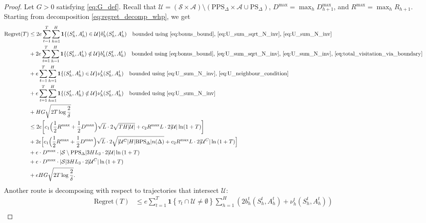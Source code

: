 \documentclass[twoside]{article}
\newcommand{\BPS}{\mathrm{BPS}_{\Delta}} %
\newcommand{\PPS}{\mathrm{PPS}_{\Delta}} %
\newcommand{\PS}{\mathrm{PS}_{\Delta}} %
\begin{document}
\begin{proof}
Let $G>0$ satisfying \eqref{eq:G_def}.
Recall that $
\mathcal{U}=(\mathcal{S}\times\mathcal{A}) \setminus (\PPS\times\mathcal{A}
\cup \PS)$, $D^{\max} = \max_h D_{h+1}^{\max}$, and $R^{\max} = \max_h R_{h+1}$. Starting from decomposition \eqref{eq:regret_decomp_whp}, we get
\begin{align*}
\mathrm{Regret}(T)
&\le
2e\sum_{t=1}^{T}\sum_{h=1}^{H}
\mathbf{1}\{(S_h^t,A_h^t)\in\mathcal{U}\}b_h^t(S_h^t,A_h^t)
\quad\text{bounded using \eqref{eq:bonus_bound}, \eqref{eq:U_sum_sqrt_N_inv}, \eqref{eq:U_sum_N_inv}}\\
&+
2e\sum_{t=1}^{T}\sum_{h=1}^{H}
\mathbf{1}\{(S_h^t,A_h^t)\notin\mathcal{U}\}b_h^t(S_h^t,A_h^t)
\quad\text{bounded using \eqref{eq:bonus_bound}, \eqref{eq:U_sum_sqrt_N_inv}, \eqref{eq:U_sum_N_inv}, \eqref{eq:total_visitation_via_boundary}}\\
&+
e\sum_{t=1}^{T}\sum_{h=1}^{H}
\mathbf{1}\{(S_h^t,A_h^t)\in\mathcal{U}\}
\nu_h^{t}(S_h^t,A_h^t)
\quad\text{bounded using \eqref{eq:U_sum_N_inv}, \eqref{eq:U_neighbour_condition}}\\
&+
e\sum_{t=1}^{T}\sum_{h=1}^{H}
\mathbf{1}\{(S_h^t,A_h^t)\notin\mathcal{U}\}
\nu_h^{t}(S_h^t,A_h^t)
\quad\text{bounded using \eqref{eq:U_sum_N_inv}}\\
&+
HG\sqrt{2T\log \dfrac{2}{\delta}}
\\
& \leq 2e\bigg[c_1\Big(\dfrac12R^{\max}+\dfrac12 D^{\max}\Big)\sqrt{L}\cdot 2\sqrt{TH|\mathcal{U}|}
+ c_2R^{\max}L\cdot 2|\mathcal{U}|\ln(1+T)\bigg]\\
&+ 2e\Big[c_1\Big(\dfrac12R^{\max}+\dfrac12 D^{\max}\Big)\sqrt{L} \cdot 2\sqrt{|\mathcal{U}^{C}|H|\BPS|n(\Delta)}
+ c_2R^{\max}L\cdot 2 |\mathcal{U}^{C}|\ln{(1+T)}\Big]\\
&+ e\cdot D^{\max}\cdot
|\mathcal{S}\setminus \PPS| 3HL_3\cdot 2 |\mathcal{U}|\ln{(1+T)}\\
&+ e\cdot D^{\max}\cdot
|\mathcal{S}| 3HL_3\cdot 2 |\mathcal{U}^{C}|\ln{(1+T)}\\
&+ eHG\sqrt{2T\log \dfrac{2}{\delta}}.
\end{align*}
Another route is decomposing with respect to trajectories that intersect 
$\mathcal{U}$:
\begin{align*}
\mathrm{Regret}(T) 
    &\le 
    e \sum_{t=1}^{T} \mathbf{1}\left\{\tau_{t}\cap \mathcal{U}\neq\emptyset\right\}\sum_{h=1}^{H} \left(2b_h^{t}(S_h^t,A_h^t)+ \nu_h^{t}(S_h^t,A_h^t)\right)\\

\end{align*}
\end{proof}
\end{document}
